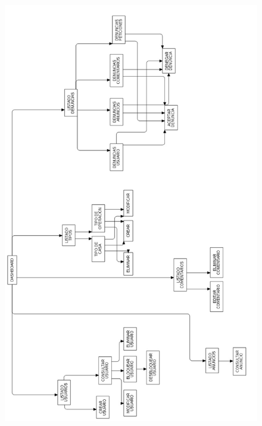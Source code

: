 \begin{figure}[h!]
\centering
\includegraphics[width=1.3\textwidth, height=.7\textheight, angle=90, origin=c]{Img/DIAGRAMASFLUJO/DASHBOARD.jpg}
\end{figure}